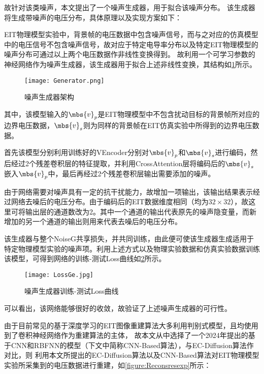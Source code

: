 故针对该类噪声，本文提出了一个噪声生成器，用于拟合该噪声分布。
该生成器将生成带噪声的电压分布，具体原理以及实现方案如下：

EIT物理模型实验中，背景帧的电压数据中包含噪声信号，而与之对应的仿真模型中的电压信号不包含噪声信号，故对应于特定电导率分布以及特定EIT物理模型的噪声分布可通过以上两个电压数据作非线性变换得到。
故利用一个可学习参数的神经网络作为噪声生成器，该生成器用于拟合上述非线性变换，其结构如\cref{figure:Generator}所示。

\begin{figure}[h]
    \centering
    \texttt{[image: Generator.png]}
    \caption{噪声生成器架构}
    \label{figure:Generator}
\end{figure}


其中，该模型输入的$\mbs{v}_p$是EIT物理模型中不包含扰动目标的背景帧所对应的边界电压数据，$\mbs{v}_s$则为同样的背景帧在EIT仿真实验中所得到的边界电压数据。
 
首先该模型分别利用训练好的VEncoder分别对$\mbs{v}_p$和$\mbs{v}_s$进行编码，然后经过2个残差卷积层的特征提取，并利用CrossAttention层将编码后的$\mbs{v}_s$嵌入$\mbs{v}_p$中，最后再经过2个残差卷积层输出需要添加的噪声。
 
由于网络需要对噪声具有一定的抗干扰能力，故增加一项输出，该输出结果表示经过网络去噪后的电压分布。由于编码后的EIT数据维度相同（均为$32\times 32$），故这里可将输出层的通道数改为2。其中一个通道的输出代表原先的噪声隐变量，而新增加的另一个通道的输出则用来代表去噪后的电压分布。

该生成器与整个NoiseG共享损失，并共同训练，由此便可使该生成器生成适用于特定物理模型实验的噪声项。利用上述方式以及物理实验数据和仿真实验数据训练该模型，可得到网络的训练-测试Loss曲线如\cref{figure:LossGe}所示。


\begin{figure}[h]
    \centering
    \texttt{[image: LossGe.jpg]}
    \caption{噪声生成器训练-测试Loss曲线}
    \label{figure:LossGe}
\end{figure}
可以看出，该网络能够很好的收敛，故验证了上述噪声生成器的可行性。




由于目前常见的基于深度学习的EIT图像重建算法大多利用判别式模型，且均使用到了卷积神经网络作为重建算法的主体，
故本文从中选择了一个2024年提出的基于CNN和RBFNN的模型\cite{RBFEIT}（下文中简称CNN-Based算法），与EC-Diffusion算法作对比，则
利用本文所提出的EC-Diffusion算法以及CNN-Based算法对EIT物理模型实验所采集到的电压数据进行重建，如\cref{figure:Reconsresexp}所示：


